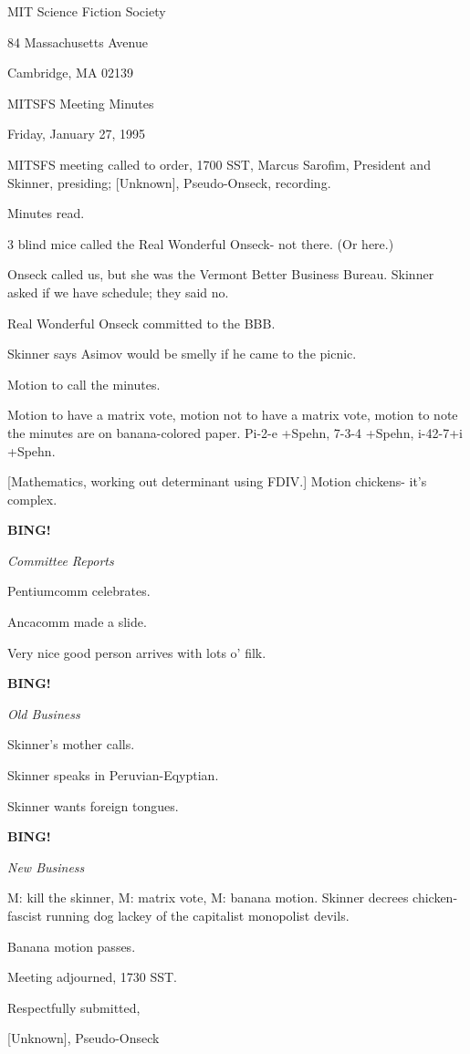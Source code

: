 \documentclass[12pt]{article}
\newcommand{\bing}{{\bf BING!} }
\newcommand{\goto}[1]{\bing \vskip 12pt \centerline{{\em{#1}}}}
\begin{document}
\begin{center}

MIT Science Fiction Society 

84 Massachusetts Avenue

Cambridge, MA 02139

\vspace{12pt}

MITSFS Meeting Minutes 

Friday, January 27, 1995

\end{center}
 
\vspace{18pt}

\setlength{\parskip}{6pt}

\noindent
MITSFS meeting called to order, 1700 SST,
Marcus Sarofim, President and Skinner, presiding; [Unknown], Pseudo-Onseck, recording.

Minutes read.

3 blind mice called the Real Wonderful Onseck- not there. (Or here.)

Onseck called us, but she was the Vermont Better Business Bureau. Skinner asked if we have schedule; they said no.

Real Wonderful Onseck committed to the BBB.

Skinner says Asimov would be smelly if he came to the picnic.

Motion to call the minutes.

Motion to have a matrix vote, motion not to have a matrix vote, motion to note the minutes are on banana-colored paper. Pi-2-e +Spehn, 7-3-4 +Spehn, i-42-7+i +Spehn.

[Mathematics, working out determinant using FDIV.] Motion chickens- it's complex.

\goto{Committee Reports}

Pentiumcomm celebrates.

Ancacomm made a slide.

Very nice good person arrives with lots o' filk.

\goto{Old Business}

Skinner's mother calls.

Skinner speaks in Peruvian-Eqyptian.

Skinner wants foreign tongues.

\goto{New Business}

M: kill the skinner, M: matrix vote, M: banana motion. Skinner decrees chicken- fascist running dog lackey of the capitalist monopolist devils.

Banana motion passes.

\vspace{12pt}

\noindent
Meeting adjourned, 1730 SST.

\vspace{18pt}

\centerline{Respectfully submitted,}
\centerline{[Unknown], Pseudo-Onseck}
\end{document}

